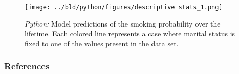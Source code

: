 \documentclass[11pt, aspectratio=169]{beamer}
\begin{document}
\begin{frame}[t]
    \begin{figure}[H]

        \centering
        \texttt{[image: ../bld/python/figures/descriptive stats\_1.png]}

        \caption{\emph{Python:} Model predictions of the smoking probability over the
            lifetime. Each colored line represents a case where marital status is fixed to
            one of the values present in the data set.}
        \label{fig:python-predictions}

    \end{figure}
\end{frame}






 {
    \begin{frame}
        \frametitle{}
    \end{frame}

}

\begin{frame}[allowframebreaks]
    \frametitle{References}
    \renewcommand{\bibfont}{\normalfont\footnotesize}
    \printbibliography
\end{frame}
\end{document}
